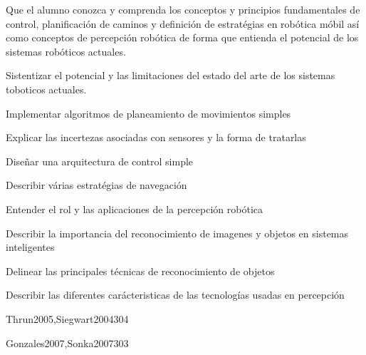 \begin{syllabus}


\begin{justification}
Que el alumno conozca y comprenda los conceptos y principios fundamentales de control, planificación de caminos 
y definición de estratégias en robótica móbil así como conceptos de percepción robótica de forma que entienda 
el potencial de los sistemas robóticos actuales.
\end{justification}

\begin{goals}
\item Sistentizar el potencial y las limitaciones del estado del arte de los sistemas toboticos actuales.
\item Implementar algoritmos de planeamiento de movimientos simples
\item Explicar las incertezas asociadas con sensores y la forma de tratarlas
\item Diseñar una arquitectura de control simple
\item Describir várias estratégias de navegación
\item Entender el rol y las aplicaciones de la percepción robótica
\item Describir la importancia del reconocimiento de imagenes y objetos en sistemas inteligentes
\item Delinear las principales técnicas de reconocimiento de objetos
\item Describir las diferentes carácteristicas de las tecnologías usadas en percepción
\end{goals}

\begin{outcomes}
\end{outcomes}

\begin{unit}{\ISRoboticsDef}{Thrun2005,Siegwart2004}{30}{4}
   \ISRoboticsAllTopics
   \ISRoboticsAllObjectives
\end{unit}

\begin{unit}{\ISPerceptionDef}{Gonzales2007,Sonka2007}{30}{3}
   \ISPerceptionAllTopics
   \ISPerceptionAllObjectives
\end{unit}



\begin{coursebibliography}
\end{coursebibliography}

\end{syllabus}
